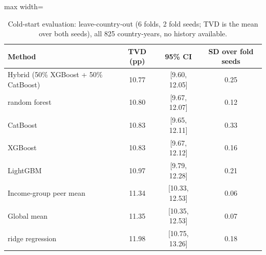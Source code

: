 \begin{table}
\caption{Cold-start evaluation: leave-country-out (6 folds, 2 fold seeds; TVD is the mean over both seeds), all 825 country-years, no history available.}\label{tab:A2}
\centering\small
\renewcommand{\arraystretch}{1.1}
\begin{adjustbox}{max width=\linewidth}
\begin{tabular}{lccc}
\toprule
Method & TVD (pp) & 95\% CI & SD over fold seeds \\
\midrule
Hybrid (50\% XGBoost + 50\% CatBoost) & 10.77 & [9.60, 12.05] & 0.25 \\
random forest & 10.80 & [9.67, 12.07] & 0.12 \\
CatBoost & 10.83 & [9.65, 12.11] & 0.33 \\
XGBoost & 10.83 & [9.67, 12.12] & 0.16 \\
LightGBM & 10.97 & [9.79, 12.28] & 0.21 \\
Income-group peer mean & 11.34 & [10.33, 12.53] & 0.06 \\
Global mean & 11.35 & [10.35, 12.53] & 0.07 \\
ridge regression & 11.98 & [10.75, 13.26] & 0.18 \\
\bottomrule
\end{tabular}\end{adjustbox}
\end{table}
